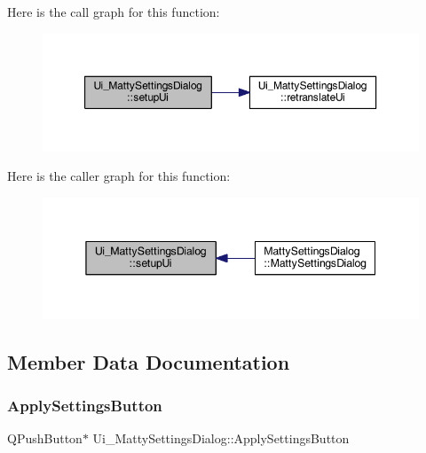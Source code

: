 Here is the call graph for this function\+:
\nopagebreak
\begin{figure}[H]
\begin{center}
\leavevmode
\includegraphics[width=350pt]{classUi__MattySettingsDialog_ad8d03029358c22b0342ea137f6d4edb9_cgraph}
\end{center}
\end{figure}
Here is the caller graph for this function\+:
\nopagebreak
\begin{figure}[H]
\begin{center}
\leavevmode
\includegraphics[width=345pt]{classUi__MattySettingsDialog_ad8d03029358c22b0342ea137f6d4edb9_icgraph}
\end{center}
\end{figure}


\subsection{Member Data Documentation}
\hypertarget{classUi__MattySettingsDialog_a6567baef3dec29ac994c8dc6da12ce0d}{}\label{classUi__MattySettingsDialog_a6567baef3dec29ac994c8dc6da12ce0d} 
\subsubsection{\texorpdfstring{Apply\+Settings\+Button}{ApplySettingsButton}}
{\footnotesize\ttfamily Q\+Push\+Button$\ast$ Ui\+\_\+\+Matty\+Settings\+Dialog\+::\+Apply\+Settings\+Button}



